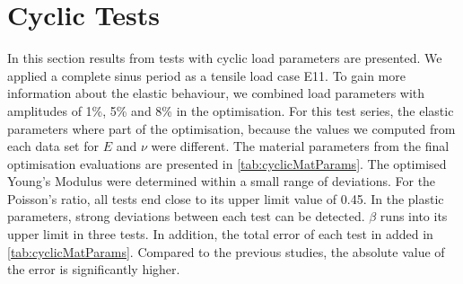 






\section{Cyclic Tests}
In this section results from tests with cyclic load parameters are presented. We applied a complete sinus period as a tensile load case E11. To gain more information about the elastic behaviour, we combined load parameters with amplitudes of 1\%, 5\% and 8\% in the optimisation. For this test series, the elastic parameters where part of the optimisation, because the values we computed from each data set for $E$ and $\nu$ were different. The material parameters from the final optimisation evaluations are presented in \autoref{tab:cyclicMatParams}. The optimised Young's Modulus were determined within a small range of deviations. For the Poisson's ratio, all tests end close to its upper limit value of 0.45. In the plastic parameters, strong deviations between each test can be detected. $\beta$ runs into its upper limit in three tests. In addition, the total error of each test in added in \autoref{tab:cyclicMatParams}. Compared to the previous studies, the absolute value of the error is significantly higher. 


